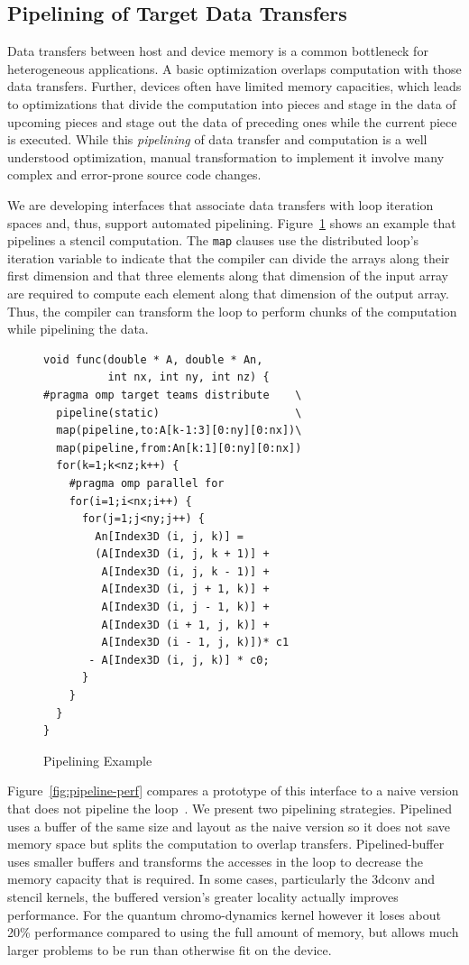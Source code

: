 \subsection{Pipelining of Target Data Transfers}
\label{sub:pipelining}

Data transfers between host and device memory is a common bottleneck 
for heterogeneous applications. A basic optimization overlaps computation
with those data transfers. Further, devices often have limited memory 
capacities, which leads to optimizations that divide the computation
into pieces and stage in the data of upcoming pieces and stage out the
data of preceding ones while the current piece is executed. While this
\emph{pipelining} of data transfer and computation is a well understood
optimization, manual transformation to implement it involve many complex
and error-prone source code changes. 

We are developing interfaces that associate data transfers with loop iteration 
spaces and, thus, support automated pipelining. Figure~\ref{fig:pipeline} shows
an example that pipelines a stencil computation. The \texttt{map} clauses use 
the distributed loop's iteration variable to indicate that the compiler 
can divide the arrays along their first dimension and that three elements 
along that dimension of the input array are required to compute each element 
along that dimension of the output array. Thus, the compiler can transform 
the loop to perform chunks of the computation while pipelining the data.

\begin{figure}
\begin{verbatim}
void func(double * A, double * An,
          int nx, int ny, int nz) {
#pragma omp target teams distribute    \
  pipeline(static)                     \
  map(pipeline,to:A[k-1:3][0:ny][0:nx])\
  map(pipeline,from:An[k:1][0:ny][0:nx])
  for(k=1;k<nz;k++) {
    #pragma omp parallel for
    for(i=1;i<nx;i++) {
      for(j=1;j<ny;j++) {
        An[Index3D (i, j, k)] =
        (A[Index3D (i, j, k + 1)] +
         A[Index3D (i, j, k - 1)] +
         A[Index3D (i, j + 1, k)] +
         A[Index3D (i, j - 1, k)] +
         A[Index3D (i + 1, j, k)] +
         A[Index3D (i - 1, j, k)])* c1
       - A[Index3D (i, j, k)] * c0;
      }
    } 
  }
}
\end{verbatim}
\caption{Pipelining Example\label{fig:pipeline}}
\end{figure}

Figure~\ref{fig:pipeline-perf} compares a prototype of this interface to a 
naive version that does not pipeline the loop~\cite{cui2017directive}. We 
present two pipelining strategies. Pipelined uses a buffer of the same size 
and layout as the naive version so it does not save memory space but splits 
the computation to overlap transfers. Pipelined-buffer uses smaller buffers
and transforms the accesses in the loop to decrease the memory capacity that
is required. In some cases, particularly the 3dconv and stencil kernels, the 
buffered version's greater locality actually improves performance. For the 
quantum chromo-dynamics kernel however it loses about 20\% performance 
compared to using the full amount of memory, but allows much larger 
problems to be run than otherwise fit on the device.

